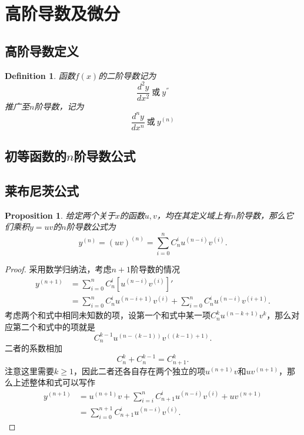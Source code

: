 \documentclass{article}
\newtheorem{proposition}[theorem]{Proposition}
\newtheorem{definition}[theorem]{Definition}
\begin{document}
\newpage
\section{高阶导数及微分}

\subsection{高阶导数定义}
\begin{definition}
\rm 函数$f(x)$的{\color{red}二阶导数}记为
$$
\frac{d^2y}{dx^2}~\text{或}~ y^{''}
$$
推广至$n$阶导数，记为
$$
\frac{d^ny}{dx^n}~\text{或}~ y^{(n)}
$$
\end{definition}

\subsection{初等函数的$n$阶导数公式}

\subsection{莱布尼茨公式}

\begin{proposition}
\rm 给定两个关于$x$的函数$u,v$，均在其定义域上有$n$阶导数，那么它们乘积$y=uv$的$n$阶导数公式为
$$
y^{(n)} =(uv)^{(n)} = \sum\limits_{i=0}^n C^i_n u^{(n-i)}v^{(i)}.
$$
\end{proposition}

\begin{proof}
采用数学归纳法，考虑$n+1$阶导数的情况
$$
\begin{array}{ll}
y^{(n+1)} &= \sum\limits_{i=0}^n C^i_n \left[u^{(n-i)}v^{(i)}\right]' \\
	&= \sum\limits_{i=0}^n C^i_n u^{(n-i+1)}v^{(i)} + \sum\limits_{i=0}^n C^i_n u^{(n-i)}v^{(i+1)}.
\end{array} 
$$
考虑两个和式中相同未知数的项，设第一个和式中某一项$C^k_n u^{(n-k+1)}v^{k}$，那么对应第二个和式中的项就是
$$
C^{k-1}_n u^{(n-(k-1))}v^{((k-1)+1)}.
$$
二者的系数相加
$$
C^k_n + C^{k-1}_n = C^k_{n+1}.
$$
注意这里需要$k\geq 1$，因此二者还各自存在两个独立的项$u^{(n+1)}v$和$uv^{(n+1)}$，那么上述整体和式可以写作
$$
\begin{array}{ll}
y^{(n+1)} &= u^{(n+1)}v + \sum\limits_{i=i}^{n} C^i_{n+1} u^{(n-i)}v^{(i)} + uv^{(n+1)} \\
& = \sum\limits_{i=0}^{n+1} C^i_{n+1} u^{(n-i)}v^{(i)}.
\end{array}
$$
\end{proof}
\end{document}

